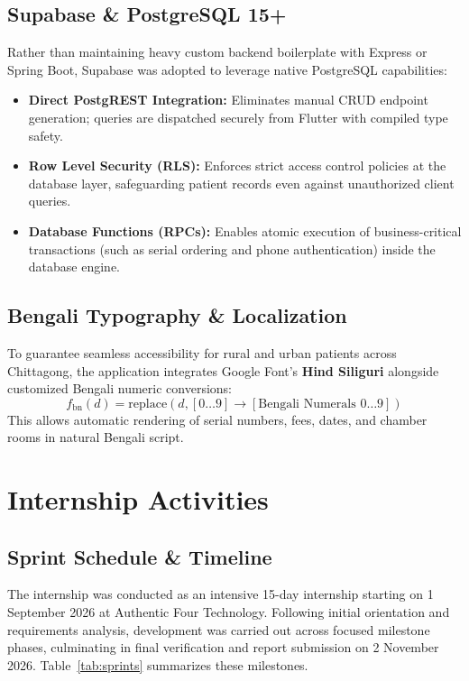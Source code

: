 \documentclass[11pt,a4paper,oneside]{report}
\begin{document}
\section{Supabase \& PostgreSQL 15+}
Rather than maintaining heavy custom backend boilerplate with Express or Spring Boot, Supabase was adopted to leverage native PostgreSQL capabilities:
\begin{itemize}
    \item \textbf{Direct PostgREST Integration:} Eliminates manual CRUD endpoint generation; queries are dispatched securely from Flutter with compiled type safety.
    \item \textbf{Row Level Security (RLS):} Enforces strict access control policies at the database layer, safeguarding patient records even against unauthorized client queries.
    \item \textbf{Database Functions (RPCs):} Enables atomic execution of business-critical transactions (such as serial ordering and phone authentication) inside the database engine.
\end{itemize}

\section{Bengali Typography \& Localization}
To guarantee seamless accessibility for rural and urban patients across Chittagong, the application integrates Google Font's \textbf{Hind Siliguri} alongside customized Bengali numeric conversions:
\begin{equation}
    f_{\text{bn}}(d) = \text{replace}(d, [0\dots9] \to [\text{Bengali Numerals } 0\dots9])
\end{equation}
This allows automatic rendering of serial numbers, fees, dates, and chamber rooms in natural Bengali script.

\chapter{Internship Activities}

\section{Sprint Schedule \& Timeline}
The internship was conducted as an intensive 15-day internship starting on 1 September 2026 at Authentic Four Technology. Following initial orientation and requirements analysis, development was carried out across focused milestone phases, culminating in final verification and report submission on 2 November 2026. Table~\ref{tab:sprints} summarizes these milestones.
\end{document}
